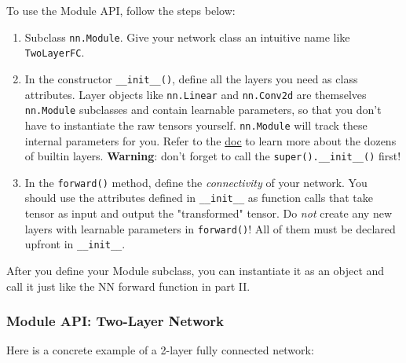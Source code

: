 \documentclass[11pt]{article}
\begin{document}
To use the Module API, follow the steps below:

\begin{enumerate}
\def\labelenumi{\arabic{enumi}.}
\item
  Subclass \texttt{nn.Module}. Give your network class an intuitive name
  like \texttt{TwoLayerFC}.
\item
  In the constructor \texttt{\_\_init\_\_()}, define all the layers you
  need as class attributes. Layer objects like \texttt{nn.Linear} and
  \texttt{nn.Conv2d} are themselves \texttt{nn.Module} subclasses and
  contain learnable parameters, so that you don't have to instantiate
  the raw tensors yourself. \texttt{nn.Module} will track these internal
  parameters for you. Refer to the
  \href{http://pytorch.org/docs/master/nn.html}{doc} to learn more about
  the dozens of builtin layers. \textbf{Warning}: don't forget to call
  the \texttt{super().\_\_init\_\_()} first!
\item
  In the \texttt{forward()} method, define the \emph{connectivity} of
  your network. You should use the attributes defined in
  \texttt{\_\_init\_\_} as function calls that take tensor as input and
  output the "transformed" tensor. Do \emph{not} create any new layers
  with learnable parameters in \texttt{forward()}! All of them must be
  declared upfront in \texttt{\_\_init\_\_}.
\end{enumerate}

After you define your Module subclass, you can instantiate it as an
object and call it just like the NN forward function in part II.

\subsubsection{Module API: Two-Layer
Network}\label{module-api-two-layer-network}

Here is a concrete example of a 2-layer fully connected network:
\end{document}
